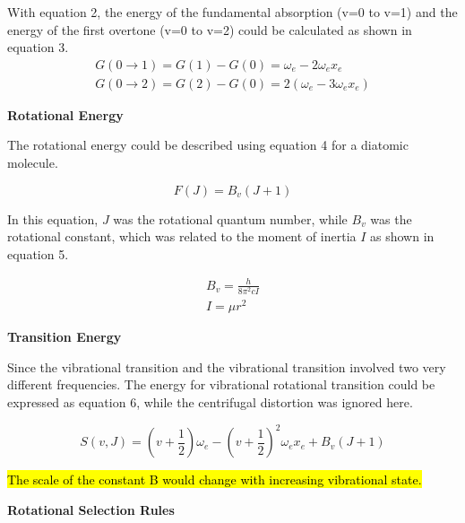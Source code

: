 \documentclass[twocolumn]{article} %
\begin{document}
With equation 2, the energy of the fundamental absorption (v=0 to v=1) and the energy of the first overtone (v=0 to v=2) could be calculated as shown in equation 3. 
\begin{subequations}
    \begin{align}
        G(0 \rightarrow 1) = G(1) - G(0) = \omega_e - 2\omega_ex_e \\
        G(0 \rightarrow 2) = G(2) - G(0) = 2(\omega_e - 3\omega_ex_e) 
    \end{align}
\end{subequations}

\textbf{Rotational Energy}

The rotational energy could be described using equation 4 for a diatomic molecule.

\begin{equation}
    F(J) = B_v(J + 1) \label{eq.4}
\end{equation}

In this equation, $J$ was the rotational quantum number, while $B_v$ was the rotational constant, which was related to the moment of inertia $I$ as shown in equation 5. 

\begin{subequations}
    \begin{align}
        B_v = \frac{h}{8\pi^2cI} \\
        I = \mu r^2
    \end{align}
\end{subequations}



\textbf{Transition Energy}

Since the vibrational transition and the vibrational transition involved two very different frequencies. The energy for vibrational rotational transition could be expressed as equation 6, while the centrifugal distortion was ignored here. 

\begin{equation}
    S(v,J) = (v + \frac{1}{2}) \omega_e - (v + \frac{1}{2})^2\omega_ex_e + B_v(J + 1) 
\end{equation}

\hl{The scale of the constant B would change with increasing vibrational state. }




\textbf{Rotational Selection Rules}
\end{document}
